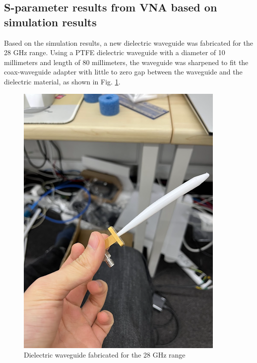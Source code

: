 \documentclass[a4paper,12pt]{report}
\begin{document}
\subsection{S-parameter results from VNA based on simulation results}
Based on the simulation results,
a new dielectric waveguide was fabricated for the 28 GHz range.
Using a PTFE dielectric waveguide with a diameter of 10 millimeters
and length of 80 millimeters,
the waveguide was sharpened to fit the coax-waveguide adapter
with little to zero gap between the waveguide and the dielectric material,
as shown in Fig. \ref{fig:waveguide_28ghz_after_sim}.

\begin{figure}
  \begin{center}
    \includegraphics[clip, keepaspectratio, width=0.9\linewidth]{img/waveguide_28ghz_after_sim.png}
    \caption{Dielectric waveguide fabricated for the 28 GHz range}
    \label{fig:waveguide_28ghz_after_sim} 
  \end{center}
\end{figure}
\end{document}
